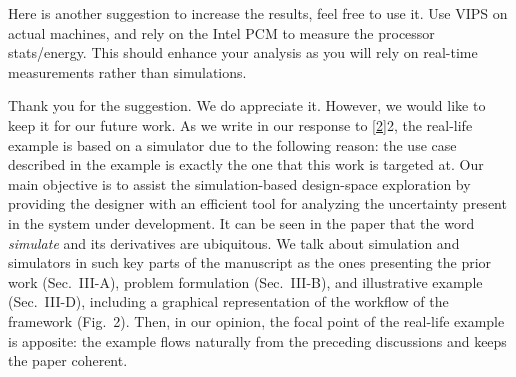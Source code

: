 \begin{reviewer}
Here is another suggestion to increase the results, feel free to use it. Use
VIPS on actual machines, and rely on the Intel PCM to measure the processor
stats/energy. This should enhance your analysis as you will rely on real-time
measurements rather than simulations.
\end{reviewer}

\begin{authors}
Thank you for the suggestion. We do appreciate it. However, we would like to
keep it for our future work. As we write in our response to \cref{2}{2}, the
real-life example is based on a simulator due to the following reason: the use
case described in the example is exactly the one that this work is targeted at.
Our main objective is to assist the simulation-based design-space exploration by
providing the designer with an efficient tool for analyzing the uncertainty
present in the system under development. It can be seen in the paper that the
word \emph{simulate} and its derivatives are ubiquitous. We talk about
simulation and simulators in such key parts of the manuscript as the ones
presenting the prior work (Sec.~III-A), problem formulation (Sec.~III-B), and
illustrative example (Sec.~III-D), including a graphical representation of the
workflow of the framework (Fig.~2). Then, in our opinion, the focal point of the
real-life example is apposite: the example flows naturally from the preceding
discussions and keeps the paper coherent.
\end{authors}
